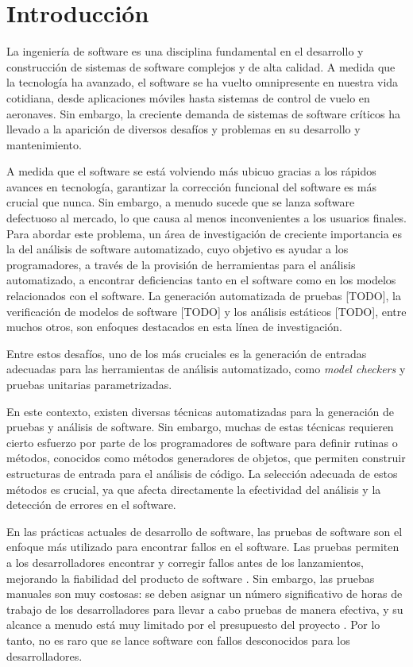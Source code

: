 \chapter[Introducción]{Introducción}
\label{cap:introduccion}

La ingeniería de software es una disciplina fundamental en el desarrollo y construcción de sistemas de software complejos y de alta calidad. A medida que la tecnología ha avanzado, el software se ha vuelto omnipresente en nuestra vida cotidiana, desde aplicaciones móviles hasta sistemas de control de vuelo en aeronaves. Sin embargo, la creciente demanda de sistemas de software críticos ha llevado a la aparición de diversos desafíos y problemas en su desarrollo y mantenimiento.


A medida que el software se está volviendo más ubicuo gracias a los rápidos avances en tecnología, garantizar la corrección funcional del software es más crucial que nunca. Sin embargo, a menudo sucede que se lanza software defectuoso al mercado, lo que causa al menos inconvenientes a los usuarios finales. Para abordar este problema, un área de investigación de creciente importancia es la del análisis de software automatizado, cuyo objetivo es ayudar a los programadores, a través de la provisión de herramientas para el análisis automatizado, a encontrar deficiencias tanto en el software como en los modelos relacionados con el software. La generación automatizada de pruebas [TODO], la verificación de modelos de software [TODO] y los análisis estáticos [TODO], entre muchos otros, son enfoques destacados en esta línea de investigación.

Entre estos desafíos, uno de los más cruciales es la generación de entradas adecuadas para las herramientas de análisis automatizado, como \emph{model checkers} y pruebas unitarias parametrizadas.

En este contexto, existen diversas técnicas automatizadas para la generación de pruebas y análisis de software. Sin embargo, muchas de estas técnicas requieren cierto esfuerzo por parte de los programadores de software para definir rutinas o métodos, 
conocidos como métodos generadores de objetos, que permiten construir estructuras de entrada para el análisis de código. La selección adecuada de estos métodos es crucial, ya que afecta directamente la efectividad del análisis y la detección de errores en el software.

En las prácticas actuales de desarrollo de software, las pruebas de software son el enfoque más utilizado para encontrar fallos en el software. Las pruebas permiten a los desarrolladores encontrar y corregir fallos antes de los lanzamientos, mejorando la fiabilidad del producto de software \cite{Ammann16,Myers11}. Sin embargo, las pruebas manuales son muy costosas: se deben asignar un número significativo de horas de trabajo de los desarrolladores para llevar a cabo pruebas de manera efectiva, y su alcance a menudo está muy limitado por el presupuesto del proyecto \cite{Ammann16,Myers11}. Por lo tanto, no es raro que se lance software con fallos desconocidos para los desarrolladores.

